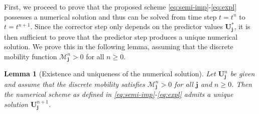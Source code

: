 \documentclass[11pt]{article}
\numberwithin{equation}{section}
\newtheorem{lemma}[theorem]{Lemma}
\newtheorem{counter example}[theorem]{Counter Example}
\numberwithin{equation}{section}
\numberwithin{equation}{section}
\begin{document}
First, we proceed to prove that the proposed scheme \eqref{eq:semi-imp}-\eqref{eq:expl} possesses a numerical solution and thus can be solved from time step $t=t^n$ to $t=t^{n+1}$. Since the corrector step only depends on the predictor values $\mathbf{U}_{\mathbf{j}}^*$, it is then sufficient to prove that the predictor step produces a unique numerical solution. We prove this in the following lemma, assuming that the discrete mobility function $\mathcal{M}_{\mathbf{j}}^n>0$ for all $n\geq 0$.
\begin{lemma}[Existence and uniqueness of the numerical solution]\label{lemma: num_existence}
Let $\mathbf{U}_{\mathbf{j}}^n$ be given and assume that the discrete mobility satisfies $\mathcal{M}_{\mathbf{j}}^n > 0$ for all $\mathbf{j}$ and $n\geq 0$. Then the numerical scheme as defined in \eqref{eq:semi-imp}-\eqref{eq:expl} admits a unique solution $\mathbf{U}_{\mathbf{j}}^{n+1}$.
\end{lemma}
\end{document}

